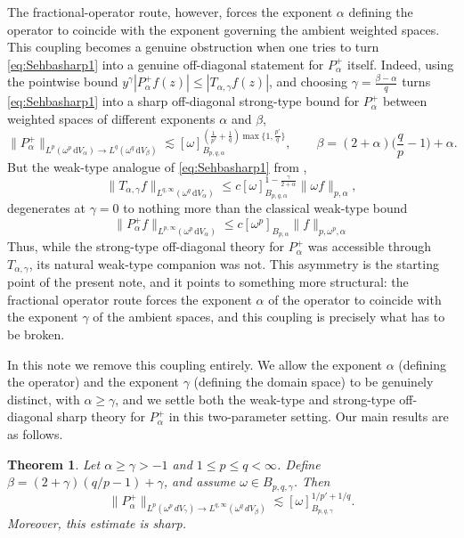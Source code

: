 \documentclass[a4paper,11pt,intlimits,oneside]{amsart}
\newtheorem{theorem}{Theorem}[section]
\theoremstyle{definition}
\numberwithin{equation}{section}
\theoremstyle{definition}
\newcommand{\Be}{\begin{equation}}
\newcommand{\Ee}{\end{equation}}
\begin{document}
The fractional-operator route, however, forces the exponent $\alpha$ defining the operator to coincide with the exponent governing the ambient weighted spaces. This coupling becomes a genuine obstruction when one tries to turn \eqref{eq:Sehbasharp1} into a genuine off-diagonal statement for $P_\alpha^+$ itself. Indeed, using the pointwise bound $y^\gamma|P_\alpha^+f(z)|\le |T_{\alpha,\gamma}f(z)|$, and choosing $\gamma=\frac{\beta-\alpha}{q}$ turns \eqref{eq:Sehbasharp1} into a sharp off-diagonal strong-type bound for $P_\alpha^+$ between weighted spaces of different exponents $\alpha$ and $\beta$,
\Be\label{eq:strongberg}\| {P}_{\alpha}^+\|_{L^p(\omega^p\,\mathrm{d}V_{\alpha})\longrightarrow L^q(\omega^q\,\mathrm{d}V_{\beta})}\lesssim [\omega]_{B_{p,q,\alpha}}^{\left(\frac{1}{p'}+\frac{1}{q}\right)\max\{1,\frac{p'}{q}\}}, \qquad \beta=(2+\alpha)\Big(\frac{q}{p}-1\Big) + \alpha.\Ee
But the weak-type analogue of \eqref{eq:Sehbasharp1} from \cite{Sehba6},
\begin{equation}\label{eq:sharpweak}\| T_{\alpha,\gamma}f\|_{L^{q,\infty}(\omega^{q}\,\mathrm{d}V_{\alpha})}\le c[\omega]_{B_{p,q,\alpha}}^{1-\frac{\gamma}{2+\alpha}}\|\omega f\|_{p,\alpha},\end{equation}
degenerates at $\gamma=0$ to nothing more than the classical weak-type bound
\begin{equation}\label{eq:sharpweakberg}\| P_{\alpha}^+f\|_{L^{p,\infty}(\omega^p\,\mathrm{d}V_{\alpha})}\le c[\omega^p]_{B_{p,\alpha}}\|f\|_{p,\omega^p,\alpha}\end{equation}
 Thus, while the strong-type off-diagonal theory for $P_\alpha^+$ was accessible through $T_{\alpha,\gamma}$, its natural weak-type companion was not. This asymmetry is the starting point of the present note, and it points to something more structural: the fractional operator route forces the exponent $\alpha$ of the operator to coincide with the exponent $\gamma$ of the ambient spaces, and this coupling is precisely what has to be broken.

In this note we remove this coupling entirely. We allow the exponent $\alpha$ (defining the operator) and the exponent $\gamma$ (defining the domain space) to be genuinely distinct, with $\alpha\ge\gamma$, and we settle both the weak-type and strong-type off-diagonal sharp theory for $P_\alpha^+$ in this two-parameter setting. Our main results are as follows.

\begin{theorem}\label{thm:sharpfracbergnew}
Let $\alpha\geq \gamma>-1$ and $1\le p\le q<\infty$. Define $\beta=(2+\gamma)(q/p-1) + \gamma$, and assume $\omega\in B_{p,q,\gamma}$. Then
\begin{equation}\label{eq:sharpfracbergnew}
\| P_{\alpha}^+\|_{L^p(\omega^p\,dV_{\gamma})\longrightarrow L^{q,\infty}(\omega^q\,dV_{\beta})}
\lesssim [\omega]_{B_{p,q,\gamma}}^{1/p'+1/q}.
\end{equation}
Moreover, this estimate is sharp.
\end{theorem}
\end{document}
